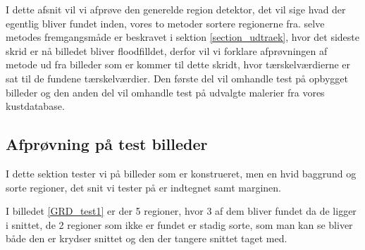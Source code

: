 {\sffamily
I dette afsnit vil vi afprøve den generelde region detektor, det vil
sige hvad der egentlig bliver fundet inden, vores to metoder sortere
regionerne fra. selve metodes fremgangsmåde er beskravet i sektion
\ref{section_udtraek}, hvor det sideste skrid er nå billedet
bliver floodfilldet, derfor vil vi forklare afprøvningen af metode ud
fra billeder som er kommer til dette skridt, hvor tærskelværdierne er
sat til de fundene tærskelværdier. Den første del vil omhandle test på
opbygget billeder og den anden del vil omhandle test på udvalgte
malerier fra vores kustdatabase.
}

\subsection{Afprøvning på test billeder}
I dette sektion tester vi på billeder som er konstrueret, men en hvid
baggrund og sorte regioner, det snit vi tester på er indtegnet samt
marginen. 

I billedet \ref{GRD_test1} er der 5 regioner, hvor 3 af dem bliver
fundet da de ligger i snittet, de 2 regioner som ikke er fundet er
stadig sorte, som man kan se bliver både den er krydser snittet og den
der tangere snittet taget med. 

\begin{figure}[!h]
    \centering
		\hspace{1em}
    	\hspace{1em}
        \caption[]{}
     \label{GRD_test1_sammen}
\end{figure}

